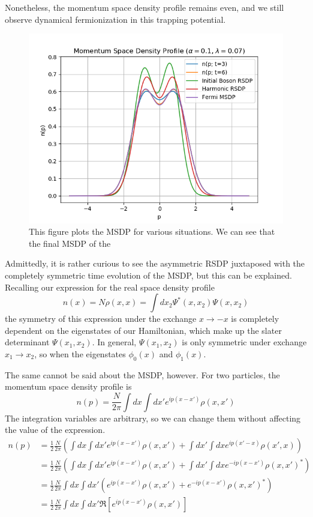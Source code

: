 \documentclass[onecolumn,english,aps,pra]{revtex4}
\begin{document}
Nonetheless, the momentum space density profile remains even, and we still observe dynamical fermionization in this trapping potential.

\begin{figure}[H]
\center
\includegraphics[scale=0.8]{../Plots/Anharmonic/MSDP-DF-ASYM}
\caption{This figure plots the MSDP for various situations.  We can see that the final MSDP of the }
\label{fig:DF_ASYM}
\end{figure}

Admittedly, it is rather curious to see the asymmetric RSDP juxtaposed with the completely symmetric time evolution of the MSDP, but this can be explained. Recalling our expression for the real space density profile
\begin{equation}
n(x) = N\rho(x,x) = \int dx_2 \Psi^*(x, x_2) \Psi(x,x_2)
\end{equation}
the symmetry of this expression under the exchange $x \rightarrow -x$ is completely dependent on the eigenstates of our Hamiltonian, which make up the slater determinant $\Psi(x_1, x_2)$. In general, $\Psi(x_1, x_2)$ is only symmetric under exchange $x_1 \rightarrow x_2$, so when the eigenstates $\phi_0(x)$ and $\phi_1(x)$.

The same cannot be said about the MSDP, however. For two particles, the momentum space density profile is
\begin{equation}
n(p) = \frac{N}{2\pi} \int dx \int dx' e^{ip(x-x')} \rho(x,x')
\end{equation}
The integration variables are arbitrary, so we can change them without affecting the value of the expression. 
\begin{align*}
n(p) & = \frac{1}{2}\frac{N}{2\pi}\left( \int dx \int dx' e^{ip(x-x')} \rho(x,x')+
 \int dx' \int dx e^{ip(x'-x)} \rho(x',x)\right)\\
& = \frac{1}{2}\frac{N}{2\pi}\left( \int dx \int dx' e^{ip(x-x')} \rho(x,x')+
 \int dx' \int dx e^{-ip(x-x')} \rho(x,x')^*\right)\\
& = \frac{1}{2}\frac{N}{2\pi} \int dx \int dx' \left(e^{ip(x-x')} \rho(x,x')+ e^{-ip(x-x')} \rho(x,x')^*\right)\\
&= \frac{1}{2}\frac{N}{2\pi} \int dx \int dx' \Re\left[e^{ip(x-x')} \rho(x,x')\right]\\
\end{align*}
\pagebreak


\end{document}
